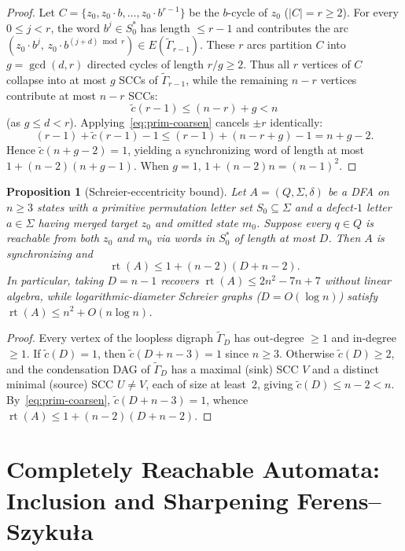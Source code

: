 \documentclass[11pt,a4paper]{article}
\newtheorem{proposition}[theorem]{Proposition}
\theoremstyle{definition}
\theoremstyle{remark}
\newcommand{\rt}{\operatorname{rt}}
\begin{document}
\begin{proof}
Let $C = \{z_0, z_0 \cdot b, \dots, z_0 \cdot b^{r - 1}\}$ be the $b$-cycle of $z_0$ ($|C| = r \ge 2$). For every $0 \le j < r$, the word $b^j \in S_0^*$ has length $\le r - 1$ and contributes the arc $(z_0 \cdot b^j,\, z_0 \cdot b^{(j + d) \bmod r}) \in E(\widetilde{\Gamma}_{r - 1})$. These $r$ arcs partition $C$ into $g = \gcd(d, r)$ directed cycles of length $r / g \ge 2$. Thus all $r$ vertices of $C$ collapse into at most $g$ SCCs of $\widetilde{\Gamma}_{r - 1}$, while the remaining $n - r$ vertices contribute at most $n - r$ SCCs:
\[
  \widetilde{c}(r - 1) \le (n - r) + g < n
\]
(as $g \le d < r$). Applying~\eqref{eq:prim-coarsen} cancels $\pm r$ identically:
\[
  (r - 1) + \widetilde{c}(r - 1) - 1 \le (r - 1) + (n - r + g) - 1 = n + g - 2.
\]
Hence $\widetilde{c}(n + g - 2) = 1$, yielding a synchronizing word of length at most $1 + (n - 2)(n + g - 1)$. When $g = 1$, $1 + (n - 2)n = (n - 1)^2$.
\end{proof}

\begin{proposition}[Schreier-eccentricity bound]\label{prop:primitive-ecc}
Let $A = (Q, \Sigma, \delta)$ be a DFA on $n \ge 3$ states with a primitive permutation letter set $S_0 \subseteq \Sigma$ and a defect-$1$ letter $a \in \Sigma$ having merged target $z_0$ and omitted state $m_0$. Suppose every $q \in Q$ is reachable from both $z_0$ and $m_0$ via words in $S_0^*$ of length at most $D$. Then $A$ is synchronizing and
\[
  \rt(A) \le 1 + (n - 2)(D + n - 2).
\]
In particular, taking $D = n - 1$ recovers $\rt(A) \le 2n^2 - 7n + 7$ without linear algebra, while logarithmic-diameter Schreier graphs ($D = O(\log n)$) satisfy $\rt(A) \le n^2 + O(n \log n)$.
\end{proposition}

\begin{proof}
Every vertex of the loopless digraph $\widetilde{\Gamma}_D$ has out-degree $\ge 1$ and in-degree $\ge 1$. If $\widetilde{c}(D) = 1$, then $\widetilde{c}(D + n - 3) = 1$ since $n \ge 3$. Otherwise $\widetilde{c}(D) \ge 2$, and the condensation DAG of $\widetilde{\Gamma}_D$ has a maximal (sink) SCC $V$ and a distinct minimal (source) SCC $U \neq V$, each of size at least~$2$, giving $\widetilde{c}(D) \le n - 2 < n$. By~\eqref{eq:prim-coarsen}, $\widetilde{c}(D + n - 3) = 1$, whence $\rt(A) \le 1 + (n - 2)(D + n - 2)$.
\end{proof}

\section{Completely Reachable Automata: Inclusion and Sharpening Ferens--Szyku\l a}\label{sec:cr}
\end{document}
